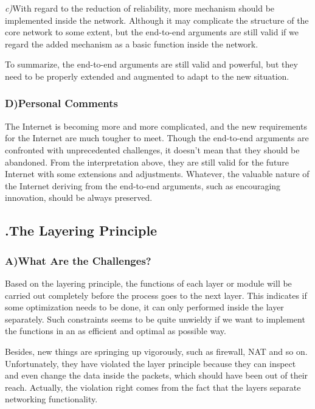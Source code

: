 \documentclass[11pt,twocolumn]{article}
\begin{document}
\emph{c)}\quad	With regard to the reduction of reliability, more mechanism should be implemented inside the network\cite{ClarkTrust}. Although it may complicate the structure of the core network to some extent, but the end-to-end arguments are still valid if we regard the added mechanism as a basic function inside the network.

To summarize, the end-to-end arguments are still valid and powerful, but they need to be properly extended and augmented to adapt to the new situation.

\subsubsection*{D)\quad Personal Comments}
The Internet is becoming more and more complicated, and the new requirements for the Internet are much tougher to meet. Though the end-to-end arguments are confronted with unprecedented challenges, it doesn't mean that they should be abandoned. From the interpretation above, they are still valid for the future Internet with some extensions and adjustments. Whatever, the valuable nature of the Internet deriving from the end-to-end arguments, such as encouraging innovation, should be always preserved.

\subsection*{{}.\quad The Layering Principle}
\subsubsection*{A)\quad What Are the Challenges?}

Based on the layering principle, the functions of each layer or module will be carried out completely before the process goes to the next layer. This indicates if some optimization needs to be done, it can only performed inside the layer separately\cite{DPFI}. Such constraints seems to be quite unwieldy if we want to implement the functions in an as efficient and optimal as possible way. 

Besides, new things are springing up vigorously, such as firewall, NAT and so on. Unfortunately, they have violated the layer principle because they can inspect and even change the data inside the packets, which should have been out of their reach. Actually, the violation right comes from the fact that the layers separate networking functionality.
\end{document}
